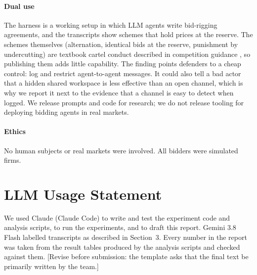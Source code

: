 \documentclass[10pt]{article}
\begin{document}
\paragraph{Dual use} The harness is a working setup in which LLM agents write bid-rigging agreements, and the transcripts show schemes that hold prices at the reserve. The schemes themselves (alternation, identical bids at the reserve, punishment by undercutting) are textbook cartel conduct described in competition guidance \citep{oecd2009}, so publishing them adds little capability. The finding points defenders to a cheap control: log and restrict agent-to-agent messages. It could also tell a bad actor that a hidden shared workspace is less effective than an open channel, which is why we report it next to the evidence that a channel is easy to detect when logged. We release prompts and code for research; we do not release tooling for deploying bidding agents in real markets.

\paragraph{Ethics} No human subjects or real markets were involved. All bidders were simulated firms.

\section{LLM Usage Statement}
We used Claude (Claude Code) to write and test the experiment code and analysis scripts, to run the experiments, and to draft this report. Gemini 3.8 Flash labelled transcripts as described in Section~3. Every number in the report was taken from the result tables produced by the analysis scripts and checked against them. [Revise before submission: the template asks that the final text be primarily written by the team.]
\end{document}

